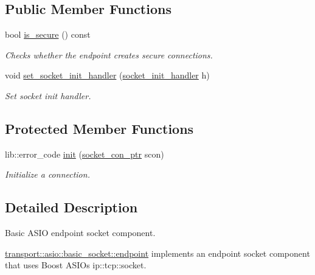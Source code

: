 \subsection*{Public Member Functions}
\begin{DoxyCompactItemize}
\item 
bool \hyperlink{classwebsocketpp_1_1transport_1_1asio_1_1basic__socket_1_1endpoint_a6550df7b22b4833d8246325c0823afc3}{is\+\_\+secure} () const
\begin{DoxyCompactList}\small\item\em Checks whether the endpoint creates secure connections. \end{DoxyCompactList}\item 
void \hyperlink{classwebsocketpp_1_1transport_1_1asio_1_1basic__socket_1_1endpoint_a0b2b36f3a69b2a7d8f54858f4fbd09e7}{set\+\_\+socket\+\_\+init\+\_\+handler} (\hyperlink{namespacewebsocketpp_1_1transport_1_1asio_1_1basic__socket_ab555b373b1b4e9af85c677c8c67db3ed}{socket\+\_\+init\+\_\+handler} h)
\begin{DoxyCompactList}\small\item\em Set socket init handler. \end{DoxyCompactList}\end{DoxyCompactItemize}
\subsection*{Protected Member Functions}
\begin{DoxyCompactItemize}
\item 
lib\+::error\+\_\+code \hyperlink{classwebsocketpp_1_1transport_1_1asio_1_1basic__socket_1_1endpoint_a33e5c5a9086204933d3d2b3cacef4236}{init} (\hyperlink{classwebsocketpp_1_1transport_1_1asio_1_1basic__socket_1_1endpoint_afe9d86dd3fe9e8c73087f22daafcd70c}{socket\+\_\+con\+\_\+ptr} scon)
\begin{DoxyCompactList}\small\item\em Initialize a connection. \end{DoxyCompactList}\end{DoxyCompactItemize}


\subsection{Detailed Description}
Basic A\+S\+IO endpoint socket component. 

\hyperlink{classwebsocketpp_1_1transport_1_1asio_1_1basic__socket_1_1endpoint}{transport\+::asio\+::basic\+\_\+socket\+::endpoint} implements an endpoint socket component that uses Boost A\+S\+IO\textquotesingle{}s ip\+::tcp\+::socket. 

